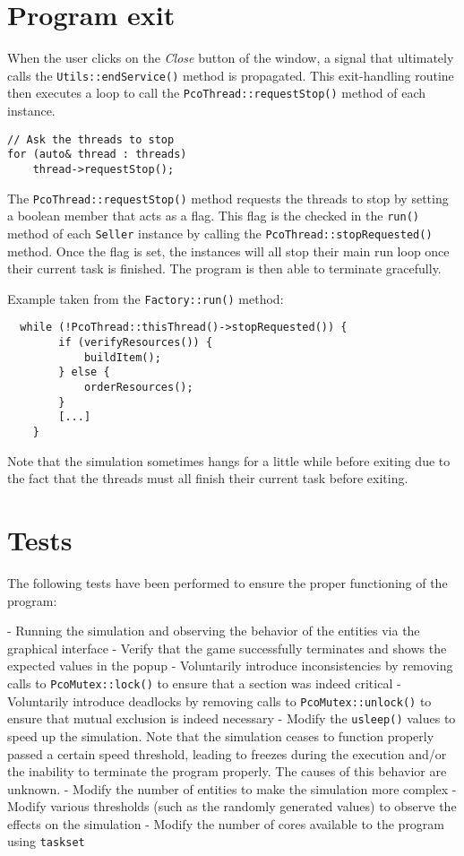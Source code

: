 \documentclass{article}
\begin{document}
    \section{Program exit}

    When the user clicks on the \textit{Close} button of the window, a signal that ultimately calls the \texttt{Utils::endService()}
    method is propagated. This exit-handling routine then executes a loop to call the \texttt{PcoThread::requestStop()} method of
    each instance.

    \begin{lstlisting}
// Ask the threads to stop
for (auto& thread : threads)
    thread->requestStop();
    \end{lstlisting}

    The \texttt{PcoThread::requestStop()} method requests the threads to stop by setting a boolean member that acts as a flag.
    This flag is the checked in the \texttt{run()} method of each \texttt{Seller} instance by calling the \texttt{PcoThread::stopRequested()}
    method. Once the flag is set, the instances will all stop their main run loop once their current task is finished. The
    program is then able to terminate gracefully.

    Example taken from the \texttt{Factory::run()} method:

    \begin{lstlisting}
  while (!PcoThread::thisThread()->stopRequested()) {
        if (verifyResources()) {
            buildItem();
        } else {
            orderResources();
        }
        [...]
    }
    \end{lstlisting}

    Note that the simulation sometimes hangs for a little while before exiting due to the fact that the threads must
    all finish their current task before exiting.


    \section{Tests}

    The following tests have been performed to ensure the proper functioning of the program:

    - Running the simulation and observing the behavior of the entities via the graphical interface
    - Verify that the game successfully terminates and shows the expected values in the popup
    - Voluntarily introduce inconsistencies by removing calls to \texttt{PcoMutex::lock()} to ensure that a section was indeed
    critical
    - Voluntarily introduce deadlocks by removing calls to \texttt{PcoMutex::unlock()} to ensure that mutual exclusion is indeed
    necessary
    - Modify the \texttt{usleep()} values to speed up the simulation. Note that the simulation ceases to function properly passed
    a certain speed threshold, leading to freezes during the execution and/or the inability to terminate the program
    properly. The causes of this behavior are unknown.
    - Modify the number of entities to make the simulation more complex
    - Modify various thresholds (such as the randomly generated values) to observe the effects on the simulation
    - Modify the number of cores available to the program using \texttt{taskset}
\end{document}
